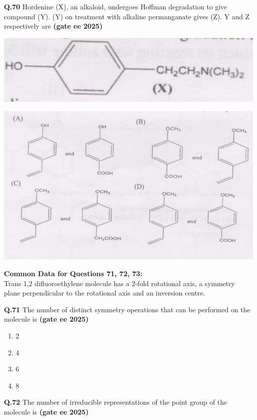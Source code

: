 \documentclass[journal,12pt,onecolumn]{exam}
\theoremstyle{remark}
\begin{document}
\noindent \textbf{Q.70} Hordenine (X), an alkaloid, undergoes Hoffman degradation to give compound (Y). (Y) on treatment with alkaline permanganate gives (Z). Y and Z respectively are \hfill{\textbf{(gate ee 2025)}}

\includegraphics[scale=1]{images/image11.png}

\includegraphics[scale=1]{images/image12.png}

\noindent \textbf{Common Data for Questions 71, 72, 73:} \\
Trans 1,2 difluoroethylene molecule has a 2-fold rotational axis, a symmetry plane perpendicular to the rotational axis and an inversion centre.

\noindent \textbf{Q.71} The number of distinct symmetry operations that can be performed on the molecule is \hfill{\textbf{(gate ee 2025)}}

\begin{multicols}{2}
\begin{enumerate}[label=(\Alph*)]
\item 2
\item 4
\item 6
\item 8
\end{enumerate}
\end{multicols}
\vspace{0.5cm}

\noindent \textbf{Q.72} The number of irreducible representations of the point group of the molecule is \hfill{\textbf{(gate ee 2025)}}
\end{document}
